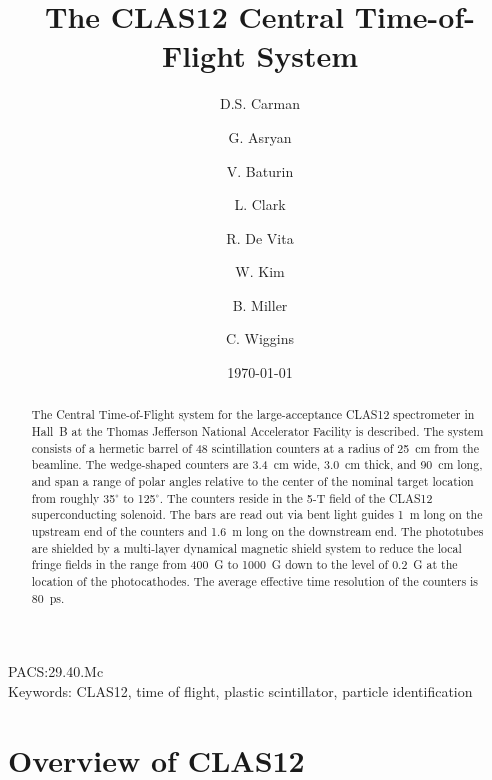\documentclass[3p,times,twocolumn]{elsarticle}
\begin{document}
\begin{frontmatter}

\title{The CLAS12 Central Time-of-Flight System}

\author[JLAB]{D.S. Carman}
\author[JLAB]{G. Asryan}
\author[JLAB]{V. Baturin}
\author[Glasgow]{L. Clark}
\author[INFN]{R. De Vita}
\author[KNU]{W. Kim} 
\author[JLAB]{B. Miller}
\author[JLAB]{C. Wiggins} 

\address[JLAB]{Thomas Jefferson National Accelerator Facility, Newport News, VA 23606, USA}
\address[Glasgow]{University of Glasgow, Glasgow G12 8QQ, United Kingdom}
\address[INFN]{INFN, Sezione di Genova, 16146 Genova, Italy}
\address[KNU]{Kyungpook National University, Daegu 41566, Republic of Korea} 

\date{\today}


\begin{abstract}
The Central Time-of-Flight system for the large-acceptance CLAS12 spectrometer in Hall~B at the
Thomas Jefferson National Accelerator Facility is described. The system consists of a hermetic
barrel of 48 scintillation counters at a radius of 25~cm from the beamline. The wedge-shaped counters
are 3.4~cm wide, 3.0~cm thick, and 90~cm long, and span a range of polar angles relative to the center
of the nominal target location from roughly 35$^\circ$ to 125$^\circ$. The counters reside in the 5-T
field of the CLAS12 superconducting solenoid. The bars are read out via bent light guides 1~m long on
the upstream end of the counters and 1.6~m long on the downstream end. The phototubes are shielded
by a multi-layer dynamical magnetic shield system to reduce the local fringe fields in the range from
400~G to 1000~G down to the level of 0.2~G at the location of the photocathodes. The average
effective time resolution of the counters is 80~ps.
\end{abstract}

\end{frontmatter}

PACS:29.40.Mc \\
Keywords: CLAS12, time of flight, plastic scintillator, particle identification

\section{Overview of CLAS12}
\end{document}
